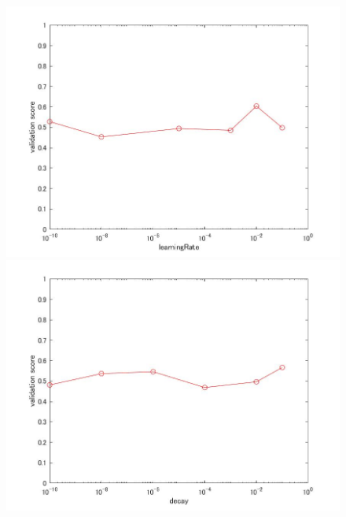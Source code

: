 \documentclass[a4j,11pt]{jarticle}
\begin{document}
\begin{figure}
\begin{minipage}{0.50\hsize}
\begin{center}
			\includegraphics[width=12cm, bb=0 0 875 656]{../matlab/fig/learningRate.jpg}
		\end{center}
	\end{minipage}
	\begin{minipage}{0.50\hsize}
		\begin{center}
			\includegraphics[width=12cm, bb=0 0 875 656]{../matlab/fig/decay.jpg}
		\end{center}
	\end{minipage}
\end{figure}
\end{document}
